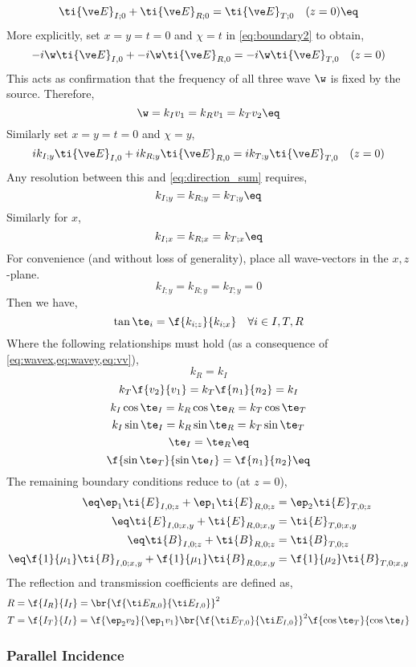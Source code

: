 \documentclass{article}
\begin{document}
\[ \ti {\ve E}_{I;0} + \ti {\ve E}_{R;0} = \ti {\ve E}_{T;0}  \quad (z=0) \eq \label{eq:direction_sum}\]
More explicitly, set $x=y=t=0$ and $\chi = t$ in \cref{eq:boundary2} to obtain,
\[ -i\w\ti {\ve E}_{I,0} + -i\w\ti {\ve E}_{R,0} = -i\w\ti {\ve E}_{T,0}  \quad (z=0) \]
This acts as confirmation that the frequency of all three wave $\w$ is fixed by the source. Therefore,
\[ \w = k_I v_{1}= k_R v_{1}= k_T v_{2} \eq \label{eq:vv}\]
Similarly set $x = y = t = 0$ and $\chi = y$,
\[ ik_{I;y}\ti {\ve E}_{I,0} + ik_{R;y}\ti {\ve E}_{R,0} = ik_{T;y}\ti {\ve E}_{T,0}  \quad (z=0) \]
Any resolution between this and \cref{eq:direction_sum} requires,
\[ k_{I;y} = k_{R;y} = k_{T;y} \eq \label{eq:wavey} \]
Similarly for $x$,
\[ k_{I;x} = k_{R;x} = k_{T;x} \eq \label{eq:wavex} \]
For convenience (and without loss of generality), place all wave-vectors in the $x,z$-plane.
\[ k_{I;y}= k_{R;y} = k_{T;y} = 0 \]
Then we have,
\[ \tan \te_i = \f{k_{i; z}}{k_{i; x}} \quad \forall i \in I, T, R \]
Where the following relationships must hold (as a consequence of \cref{eq:wavex,eq:wavey,eq:vv}),
\[ k_R = k_I \]
\[ k_T\f{v_2}{v_1} = k_T\f{n_1}{n_2} = k_I \]
\[ k_{I}\cos\te_{I} = k_{R}\cos\te_{R} = k_{T}\cos\te_{T} \]
\[ k_{I}\sin\te_{I} = k_{R}\sin\te_{R} = k_{T}\sin\te_{T} \]
\[ \te_I = \te_R \eq \label{eq:ir}\]
\[ \f{\sin\te_{T}}{\sin\te_{I}} = \f{n_1}{n_2} \eq \label{eq:snell}\]
The remaining boundary conditions reduce to (at $z=0$),
\begin{align*}
    \eq \label{eq:b1}\ep_{1} \ti {E}_{I, 0; z} + \ep_{1} \ti {E}_{R, 0; z} &= \ep_{2} \ti {E}_{T, 0; z} \\
    \eq \label{eq:b2}\ti {E}_{I, 0; x,y} + \ti {E}_{R, 0; x,y} &= \ti {E}_{T, 0; x,y} \\
    \eq \label{eq:b3}\ti {B}_{I, 0; z} + \ti {B}_{R, 0; z} &= \ti {B}_{T, 0; z} \\
    \eq \label{eq:b4}\f{1}{\mu_1}\ti {B}_{I, 0; x,y} + \f{1}{\mu_1}\ti {B}_{R, 0; x,y} &= \f{1}{\mu_2}\ti {B}_{T, 0; x,y}
\end{align*}
The reflection and transmission coefficients are defined as,
\begin{align*}
    R &= \f{I_R}{I_I} = \br{\f{\ti E_{R,0}}{\ti E_{I,0}}}^2 \\
    T &= \f{I_T}{I_I} = \f{\ep_2 v_2}{\ep_1 v_1}\br{\f{\ti E_{T,0}}{\ti E_{I,0}}}^2 \f{\cos \te_T}{\cos \te_I}
\end{align*}

\subsubsection{Parallel Incidence}
\end{document}
